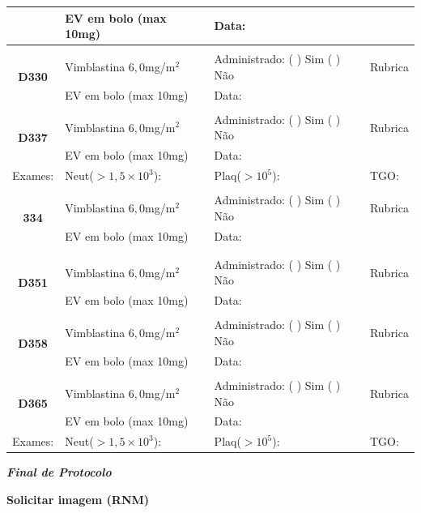 \documentclass[11pt,a4paper,oldfontcommands]{memoir}
\begin{document}
\begin{center}
\begin{longtable}{p{1cm}p{5cm}|p{5cm}|p{3cm}}
    \multicolumn{1}{c|}{}&{EV em bolo (max 10mg)}&{Data:}&\\
    \hline
    \\
    \hline
    \multicolumn{1}{c|}{\multirow{2}{*}{\textbf{D330}}}&{Vimblastina \(6,0\)mg/m\(^2\)}&{Administrado: (  ) Sim (  ) Não}&{Rubrica}\\
    \multicolumn{1}{c|}{}&{EV em bolo (max 10mg)}&{Data:}&\\
    \hline
    \\
    \hline
    \multicolumn{1}{c|}{\multirow{2}{*}{\textbf{D337}}}&{Vimblastina \(6,0\)mg/m\(^2\)}&{Administrado: (  ) Sim (  ) Não}&{Rubrica}\\
    \multicolumn{1}{c|}{}&{EV em bolo (max 10mg)}&{Data:}&\\
    \hline
    {\tiny{Exames:}}&{\tiny{Neut(\(>1,5\times10^3\)):}}&{\tiny{Plaq(\(>10^5\)):}}&{\tiny{TGO:}}
    \\
    \hline
    \\
    \hline
    \multicolumn{1}{c|}{\multirow{2}{*}{\textbf{334}}}&{Vimblastina \(6,0\)mg/m\(^2\)}&{Administrado: (  ) Sim (  ) Não}&{Rubrica}\\
    \multicolumn{1}{c|}{}&{EV em bolo (max 10mg)}&{Data:}&\\
    \hline\\[0.6cm]
    \\
    \hline
    \multicolumn{1}{c|}{\multirow{2}{*}{\textbf{D351}}}&{Vimblastina \(6,0\)mg/m\(^2\)}&{Administrado: (  ) Sim (  ) Não}&{Rubrica}\\
    \multicolumn{1}{c|}{}&{EV em bolo (max 10mg)}&{Data:}&\\
    \hline
    \\
    \hline
    \multicolumn{1}{c|}{\multirow{2}{*}{\textbf{D358}}}&{Vimblastina \(6,0\)mg/m\(^2\)}&{Administrado: (  ) Sim (  ) Não}&{Rubrica}\\
    \multicolumn{1}{c|}{}&{EV em bolo (max 10mg)}&{Data:}&\\
    \hline
    \\
    \hline
    \multicolumn{1}{c|}{\multirow{2}{*}{\textbf{D365}}}&{Vimblastina \(6,0\)mg/m\(^2\)}&{Administrado: (  ) Sim (  ) Não}&{Rubrica}\\
    \multicolumn{1}{c|}{}&{EV em bolo (max 10mg)}&{Data:}&\\
    \hline
    {\tiny{Exames:}}&{\tiny{Neut(\(>1,5\times10^3\)):}}&{\tiny{Plaq(\(>10^5\)):}}&{\tiny{TGO:}}
    \\
   \hline
\end{longtable}
\textbf{\textit{Final de Protocolo}}

\textbf{Solicitar imagem (RNM)}
\end{center}
\end{document}
